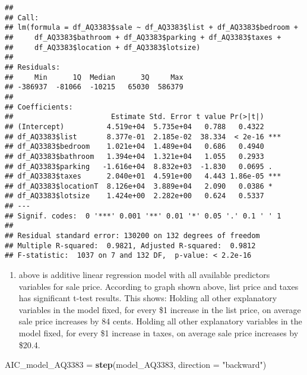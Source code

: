 \documentclass[
]{article}
\newenvironment{Shaded}{\begin{snugshade}}{\end{snugshade}}
\newcommand{\DataTypeTok}[1]{\textcolor[rgb]{0.13,0.29,0.53}{#1}}
\newcommand{\KeywordTok}[1]{\textcolor[rgb]{0.13,0.29,0.53}{\textbf{#1}}}
\newcommand{\NormalTok}[1]{#1}
\newcommand{\StringTok}[1]{\textcolor[rgb]{0.31,0.60,0.02}{#1}}
\providecommand{\tightlist}{%
  \setlength{\itemsep}{0pt}\setlength{\parskip}{0pt}}
\begin{document}
\begin{verbatim}
## 
## Call:
## lm(formula = df_AQ3383$sale ~ df_AQ3383$list + df_AQ3383$bedroom + 
##     df_AQ3383$bathroom + df_AQ3383$parking + df_AQ3383$taxes + 
##     df_AQ3383$location + df_AQ3383$lotsize)
## 
## Residuals:
##     Min      1Q  Median      3Q     Max 
## -386937  -81066  -10215   65030  586379 
## 
## Coefficients:
##                       Estimate Std. Error t value Pr(>|t|)    
## (Intercept)          4.519e+04  5.735e+04   0.788   0.4322    
## df_AQ3383$list       8.377e-01  2.185e-02  38.334  < 2e-16 ***
## df_AQ3383$bedroom    1.021e+04  1.489e+04   0.686   0.4940    
## df_AQ3383$bathroom   1.394e+04  1.321e+04   1.055   0.2933    
## df_AQ3383$parking   -1.616e+04  8.832e+03  -1.830   0.0695 .  
## df_AQ3383$taxes      2.040e+01  4.591e+00   4.443 1.86e-05 ***
## df_AQ3383$locationT  8.126e+04  3.889e+04   2.090   0.0386 *  
## df_AQ3383$lotsize    1.424e+00  2.282e+00   0.624   0.5337    
## ---
## Signif. codes:  0 '***' 0.001 '**' 0.01 '*' 0.05 '.' 0.1 ' ' 1
## 
## Residual standard error: 130200 on 132 degrees of freedom
## Multiple R-squared:  0.9821, Adjusted R-squared:  0.9812 
## F-statistic:  1037 on 7 and 132 DF,  p-value: < 2.2e-16
\end{verbatim}

\begin{enumerate}
\def\labelenumi{\roman{enumi})}
\tightlist
\item
  above is additive linear regression model with all available
  predictors variables for sale price. According to graph shown above,
  list price and taxes has significant t-test results. This shows:
  Holding all other explanatory variables in the model fixed, for every
  \$1 increase in the list price, on average sale price increases by 84
  cents. Holding all other explanatory variables in the model fixed, for
  every \$1 increase in taxes, on average sale price increases by
  \$20.4.
\end{enumerate}

\begin{Shaded}
\begin{Highlighting}[]
\NormalTok{AIC_model_AQ3383 =}\StringTok{ }\KeywordTok{step}\NormalTok{(model_AQ3383, }\DataTypeTok{direction =} \StringTok{"backward"}\NormalTok{)}
\end{Highlighting}
\end{Shaded}
\end{document}
